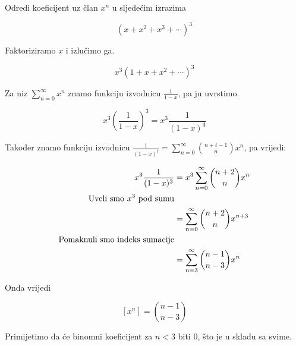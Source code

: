 \documentclass{article}
\begin{document}
	Odredi koeficijent uz član \( x^n \) u sljedećim izrazima
	
	\[ (x + x^2 + x^3 + \cdots)^3 \]
	
	Faktoriziramo \( x \) i izlučimo ga.
	
	\[ x^3 (1 + x + x^2 + \cdots)^3 \]
	
	Za niz \( \sum\limits^\infty_{n=0} x^n \) znamo funkciju izvodnicu \( \frac{1}{1 - x} \), pa ju uvrstimo.
	
	\[ x^3 \left ( \frac{1}{1 - x} \right )^3 = x^3 \frac{1}{(1 - x)^3} \]
	
	Također znamo funkciju izvodnicu \( \frac{1}{(1 - x)^t} = \sum\limits^\infty_{n=0} \binom{n + t - 1}{n} x^n \), pa vrijedi:
	
	\begin{align*}
		x^3 \frac{1}{(1 - x)^3} &= x^3 \sum\limits^\infty_{n=0} \binom{n + 2}{n} x^n \\
		\text{Uveli smo \( x^3 \) pod sumu} \\
		&= \sum\limits^\infty_{n=0} \binom{n + 2}{n} x^{n + 3} \\
		\text{Pomaknuli smo indeks sumacije} \\
		&= \sum\limits^\infty_{n=3} \binom{n - 1}{n - 3} x^n
	\end{align*}
	
	Onda vrijedi
	
	\[ [x^n] = \binom{n - 1}{n - 3} \]
	
	Primijetimo da će binomni koeficijent za \( n < 3 \) biti 0, što je u skladu sa svime.
\end{document}

